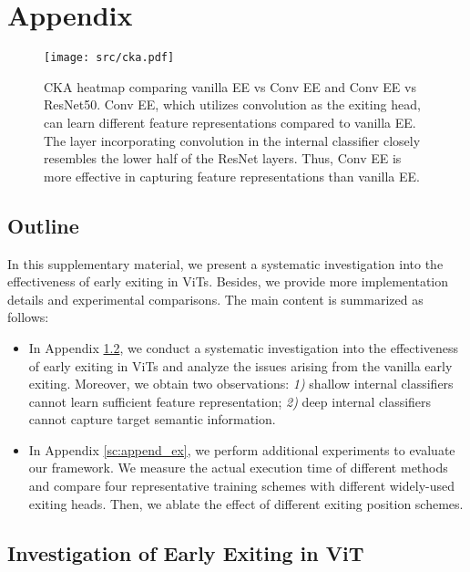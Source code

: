 \clearpage

\section{Appendix}

\begin{figure}[t]
  \begin{center}
    \texttt{[image: src/cka.pdf]}
  \end{center}
  \vspace{-9pt}
  \caption{CKA heatmap comparing vanilla EE vs Conv EE and Conv EE vs ResNet50. 
  Conv EE, which utilizes convolution as the exiting head, can learn different feature representations compared to vanilla EE. 
  The layer incorporating convolution in the internal classifier closely resembles the lower half of the ResNet layers. 
  Thus, Conv EE is more effective in capturing feature representations than vanilla EE.} 
  \label{fig:cka}
  \vspace{-6pt}
\end{figure}

\subsection{Outline}
In this supplementary material, we present a systematic investigation into the effectiveness of early exiting in ViTs. 
Besides, we provide more implementation details and experimental comparisons.
The main content is summarized as follows:
\begin{itemize}
  \item In Appendix \ref{sc:investigation}, we conduct a systematic investigation into the effectiveness of early exiting in ViTs and analyze the issues arising from the vanilla early exiting. 
  Moreover, we obtain two observations: \textit{1)} shallow internal classifiers cannot learn sufficient feature representation; \textit{2)} deep internal classifiers cannot capture target semantic information. 
  \item In Appendix \ref{sc:append_ex}, we perform additional experiments to evaluate our framework. We measure the actual execution time of different methods and compare four representative training schemes with different widely-used exiting heads. 
  Then, we ablate the effect of different exiting position schemes.
\end{itemize}




\subsection{Investigation of Early Exiting in ViT}
\label{sc:investigation}



